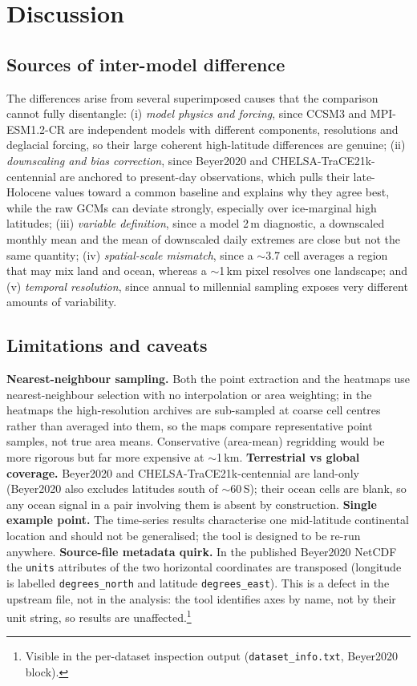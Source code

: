 \documentclass{isprs} %
\newcommand{\dg}{\textdegree}
\newcommand{\tabbr}[1]{\texttt{#1}}
\begin{document}
\section{Discussion}

\subsection{Sources of inter-model difference}
The differences arise from several superimposed causes that the comparison cannot fully disentangle: (i) \emph{model physics and forcing}, since CCSM3 and MPI-ESM1.2-CR are independent models with different components, resolutions and deglacial forcing, so their large coherent high-latitude differences are genuine; (ii) \emph{downscaling and bias correction}, since Beyer2020 and CHELSA-TraCE21k-centennial are anchored to present-day observations, which pulls their late-Holocene values toward a common baseline and explains why they agree best, while the raw GCMs can deviate strongly, especially over ice-marginal high latitudes; (iii) \emph{variable definition}, since a model 2\,m diagnostic, a downscaled monthly mean and the mean of downscaled daily extremes are close but not the same quantity; (iv) \emph{spatial-scale mismatch}, since a $\sim$3.7\dg{} cell averages a region that may mix land and ocean, whereas a $\sim$1\,km pixel resolves one landscape; and (v) \emph{temporal resolution}, since annual to millennial sampling exposes very different amounts of variability.

\subsection{Limitations and caveats}\label{sec:caveats}
\textbf{Nearest-neighbour sampling.} Both the point extraction and the heatmaps use nearest-neighbour selection with no interpolation or area weighting; in the heatmaps the high-resolution archives are sub-sampled at coarse cell centres rather than averaged into them, so the maps compare representative point samples, not true area means. Conservative (area-mean) regridding would be more rigorous but far more expensive at $\sim$1\,km. \textbf{Terrestrial vs global coverage.} Beyer2020 and CHELSA-TraCE21k-centennial are land-only (Beyer2020 also excludes latitudes south of $\sim$60\dg\,S); their ocean cells are blank, so any ocean signal in a pair involving them is absent by construction. \textbf{Single example point.} The time-series results characterise one mid-latitude continental location and should not be generalised; the tool is designed to be re-run anywhere. \textbf{Source-file metadata quirk.} In the published Beyer2020 NetCDF the \tabbr{units} attributes of the two horizontal coordinates are transposed (longitude is labelled \tabbr{degrees\_north} and latitude \tabbr{degrees\_east}). This is a defect in the upstream file, not in the analysis: the tool identifies axes by name, not by their unit string, so results are unaffected.\footnote{Visible in the per-dataset inspection output (\tabbr{dataset\_info.txt}, Beyer2020 block).}
\end{document}
